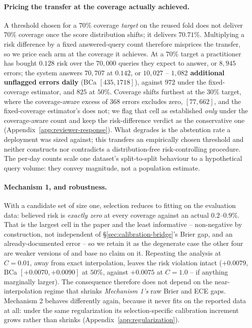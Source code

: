 \documentclass{article}
\begin{document}
\paragraph{Pricing the transfer at the coverage actually achieved.} A threshold
chosen for a $70\%$ coverage \emph{target} on the reused fold does not deliver
$70\%$ coverage once the score distribution shifts; it delivers $70.71\%$.
Multiplying a risk difference by a fixed answered-query count therefore
misprices the transfer, so we price each arm at the coverage it achieves. At a
$70\%$ target a practitioner has bought $0.128$ risk over the $70{,}000$
queries they expect to answer, or $8{,}945$ errors; the system answers
$70{,}707$ at $0.142$, or $10{,}027$ -- \textbf{$1{,}082$ additional unflagged
errors daily} (BCa $[435,1718]$), against $972$ under the fixed-coverage
estimator, and $825$ at $50\%$. Coverage shifts furthest at the $30\%$ target,
where the coverage-aware excess of $368$ errors excludes zero, $[77,662]$,
and the fixed-coverage estimator's does not; we flag that cell as established
\emph{only} under the coverage-aware count and keep the risk-difference
verdict as the conservative one (Appendix~\ref{app:reviewer-response}). What
degrades is the abstention rate a deployment was sized against; this transfers
an empirically chosen threshold and neither constructs nor contradicts a
distribution-free risk-controlling procedure. The per-day counts scale one
dataset's split-to-split behaviour to a hypothetical query volume: they convey
magnitude, not a population estimate.

\paragraph{Mechanism 1, and robustness.} With a candidate set of size one,
selection reduces to fitting on the evaluation data: believed risk is
\emph{exactly zero} at every coverage against an actual $0.2$--$0.9\%$. That is
the largest cell in the paper and the least informative -- non-negative by
construction, not independent of \S\ref{sec:calibration-bridge}'s Brier gap,
and an already-documented error -- so we retain it as the degenerate case the
other four are weaker versions of and base no claim on it. Repeating the
analysis at $C=0.01$, away from exact interpolation, leaves the risk violation
intact ($+0.0079$, BCa $[+0.0070,+0.0090]$ at $50\%$, against $+0.0075$ at
$C=1.0$ -- if anything marginally larger). The consequence therefore does not
depend on the near-interpolation regime that shrinks \emph{Mechanism 1's} raw
Brier and ECE gaps. Mechanism 2 behaves differently again, because it never
fits on the reported data at all: under the same regularization its
selection-specific calibration increment grows rather than shrinks
(Appendix~\ref{app:regularization}).
\end{document}
